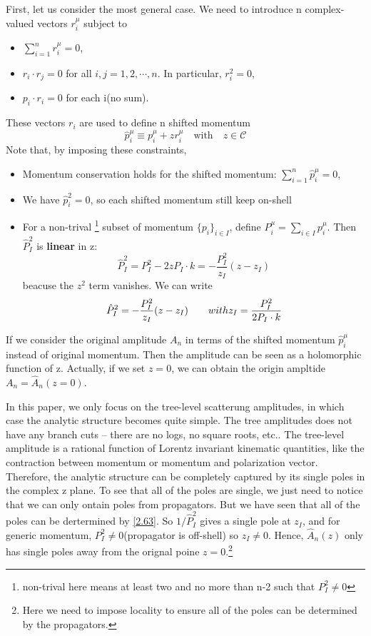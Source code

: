 \documentclass[12pt]{article}
\numberwithin{equation}{section}
\begin{document}
First, let us consider the most general case. We need to introduce n complex-valued vectors $r_i^\mu$ subject to 
\begin{itemize}
    \item $\sum_{i=1}^{n}r_i^\mu=0$,
    \item $r_i\cdot r_j=0$ for all $i,j=1,2,\cdots ,n$. In particular, $r_i^2=0$,
    \item $p_i\cdot r_i=0$ for each i(no sum).
\end{itemize}
These vectors $r_i$ are used to define n shifted momentum
\begin{equation}
    \hat{p}_i^\mu\equiv p_i^\mu+zr_i^\mu\quad \text{with}\quad z\in \mathcal{C}
\end{equation}
Note that, by imposing these constraints,
\begin{itemize}
    \item Momentum conservation holds for the shifted momentum: $\sum_{i=1}^{n}\hat{p}_i^\mu=0$,
    \item We have $\hat{p}_i^2=0$, so each shifted momentum still keep on-shell
    \item For a non-trival \footnote{non-trival here means at least two and no more than n-2 such that $P_I^2\neq 0$} subset of momentum $\{p_i\}_{i\in I}$,
    define $P_i^\mu=\sum_{i\in I}p_i^\mu$. Then $\hat{P}_I^2$ is \textbf{linear} in z:
    \begin{equation}
        \hat{P}_I^2=P_I^2 -2zP_I\cdot k=-\frac{P_I^2}{z_I}(z-z_I)
    \end{equation}
    beacuse the $z^2$ term vanishes. We can write 
    \begin{equation}
        \hat{P}_I^2=-\frac{P_I^2}{z_I}(z-z_I)\quad \text\quad {with} z_I=\frac{P_I^2}{2P_I\cdot k}
        \label{2.63}
    \end{equation}
\end{itemize}
If we consider the original amplitude $A_n$ in terms of the shifted momentum $\hat{p}_i^\mu$ instead of original momentum. Then the amplitude can be seen as 
a holomorphic function of z. Actually, if we set $z=0$, we can obtain the origin ampltide $A_n=\hat{A}_n(z=0)$.

In this paper, we only focus on the tree-level scatterung amplitudes, in which case the analytic structure becomes quite simple. The tree amplitudes does not have any branch cuts -- there are no 
logs, no square roots, etc.. The tree-level amplitude is a rational function of Lorentz invariant kinematic quantities, like the contraction between momentum or momentum and polarization vector. 
Therefore, the analytic structure can be completely captured by its single poles in the complex z plane. To see that all of the poles are single, we just need to notice 
that we can only ontain poles from propagators. But we have seen that all of the poles can be dertermined by  \eqref{2.63}. 
So $1/\hat{P}_I^2$ gives a single pole at $z_I$, and for generic momentum, $P_I^2\neq 0$(propagator is off-shell) so $z_I\neq 0$. Hence, 
$\hat{A}_n(z)$ only has single poles away from the orignal poine $z=0$.\footnote{Here we need to impose locality to ensure all of the poles can be determined by the propagators.} 
\end{document}
